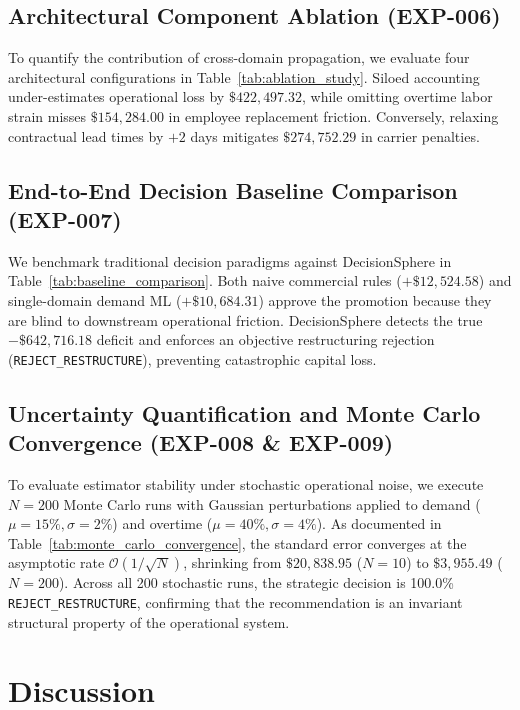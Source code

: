 \documentclass[10pt,conference]{IEEEtran}
\begin{document}
\subsection{Architectural Component Ablation (EXP-006)}
To quantify the contribution of cross-domain propagation, we evaluate four architectural configurations in Table~\ref{tab:ablation_study}. Siloed accounting under-estimates operational loss by $\$422,497.32$, while omitting overtime labor strain misses $\$154,284.00$ in employee replacement friction. Conversely, relaxing contractual lead times by $+2$ days mitigates $\$274,752.29$ in carrier penalties.



\subsection{End-to-End Decision Baseline Comparison (EXP-007)}
We benchmark traditional decision paradigms against DecisionSphere in Table~\ref{tab:baseline_comparison}. Both naive commercial rules ($+\$12,524.58$) and single-domain demand ML ($+\$10,684.31$) approve the promotion because they are blind to downstream operational friction. DecisionSphere detects the true $-\$642,716.18$ deficit and enforces an objective restructuring rejection (\texttt{REJECT\_RESTRUCTURE}), preventing catastrophic capital loss.



\subsection{Uncertainty Quantification and Monte Carlo Convergence (EXP-008 \& EXP-009)}
To evaluate estimator stability under stochastic operational noise, we execute $N=200$ Monte Carlo runs with Gaussian perturbations applied to demand ($\mu=15\%, \sigma=2\%$) and overtime ($\mu=40\%, \sigma=4\%$). As documented in Table~\ref{tab:monte_carlo_convergence}, the standard error converges at the asymptotic rate $\mathcal{O}(1/\sqrt{N})$, shrinking from $\$20,838.95$ ($N=10$) to $\$3,955.49$ ($N=200$). Across all 200 stochastic runs, the strategic decision is 100.0\% \texttt{REJECT\_RESTRUCTURE}, confirming that the recommendation is an invariant structural property of the operational system.



\section{Discussion}
\end{document}

